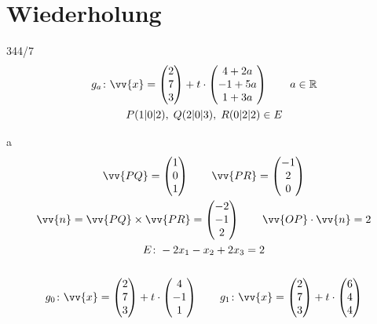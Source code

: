 \section{Wiederholung}
\begin{exercise}{344/7}
  \begin{gather*}
    g_a \colon \vv{x} = \begin{pmatrix}2 \\ 7 \\ 3\end{pmatrix} + t \cdot \begin{pmatrix}4 + 2a \\ -1 + 5a \\ 1 + 3a\end{pmatrix} \qquad a \in \mathbb{R} \\
    P(1|0|2),\; Q(2|0|3),\; R(0|2|2) \in E
  \end{gather*}
  \item [a]
  \begin{gather*}
    \vv{PQ} = \begin{pmatrix}1 \\ 0 \\ 1\end{pmatrix} \qquad \vv{PR} = \begin{pmatrix}-1 \\ 2 \\ 0\end{pmatrix} \\
    \vv{n} = \vv{PQ} \times \vv{PR} = \begin{pmatrix}-2 \\ -1 \\ 2\end{pmatrix} \qquad \vv{OP} \cdot \vv{n} = 2 \\
    E \colon -2x_1 - x_2 + 2x_3 = 2 \\\\
    g_0 \colon \vv{x} = \begin{pmatrix}2 \\ 7 \\ 3\end{pmatrix} + t \cdot \begin{pmatrix}4 \\ -1 \\ 1\end{pmatrix} \qquad g_1 \colon \vv{x} = \begin{pmatrix}2 \\ 7 \\ 3\end{pmatrix} + t \cdot \begin{pmatrix}6 \\ 4 \\ 4\end{pmatrix} \\\\

\end{gather*}
\end{exercise}
